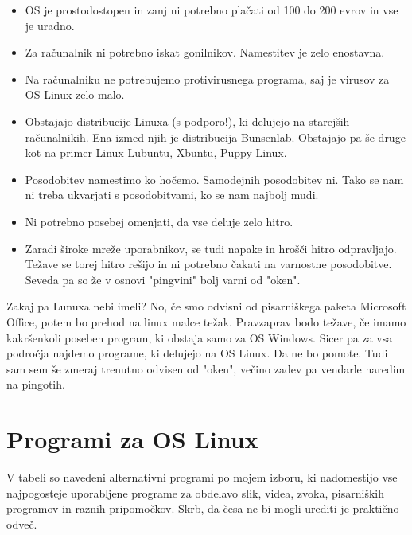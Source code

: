 \documentclass[12pt,a4paper,twoside]{article}
\begin{document}
\begin{itemize}
\item OS je prostodostopen in zanj ni potrebno plačati od 100 do 200 evrov in vse je uradno.
\item Za računalnik ni potrebno iskat gonilnikov. Namestitev je zelo enostavna. 
\item Na računalniku ne potrebujemo protivirusnega programa, saj je virusov za OS Linux zelo malo.
\item Obstajajo distribucije Linuxa (s podporo!), ki delujejo na starejših računalnikih. Ena izmed njih je distribucija Bunsenlab. Obstajajo pa še druge kot na primer Linux Lubuntu, Xbuntu, Puppy Linux.
\item Posodobitev namestimo ko hočemo. Samodejnih posodobitev ni. Tako se nam ni treba ukvarjati s posodobitvami, ko se nam najbolj mudi. 
\item Ni potrebno posebej omenjati, da vse deluje zelo hitro.
\item Zaradi široke mreže uporabnikov, se tudi napake in hrošči hitro odpravljajo. Težave se torej hitro rešijo in ni potrebno čakati na varnostne posodobitve. Seveda pa so že v osnovi "pingvini" bolj varni od "oken". 
\end{itemize}

Zakaj pa Lunuxa nebi imeli? 
No, če smo odvisni od pisarniškega paketa Microsoft Office, potem bo prehod na linux malce težak. Pravzaprav bodo težave, če imamo kakršenkoli poseben program, ki obstaja samo za OS Windows. Sicer pa za vsa področja najdemo programe, ki delujejo na OS Linux. Da ne bo pomote. Tudi sam sem še zmeraj trenutno odvisen od "oken", večino zadev pa vendarle naredim na pingotih.

\newpage
\section{Programi za OS Linux}
V tabeli so navedeni alternativni programi po mojem izboru, ki nadomestijo vse najpogosteje uporabljene programe za obdelavo slik, videa, zvoka, pisarniških programov in raznih pripomočkov. Skrb, da česa ne bi mogli urediti je praktično odveč.

\end{document}

